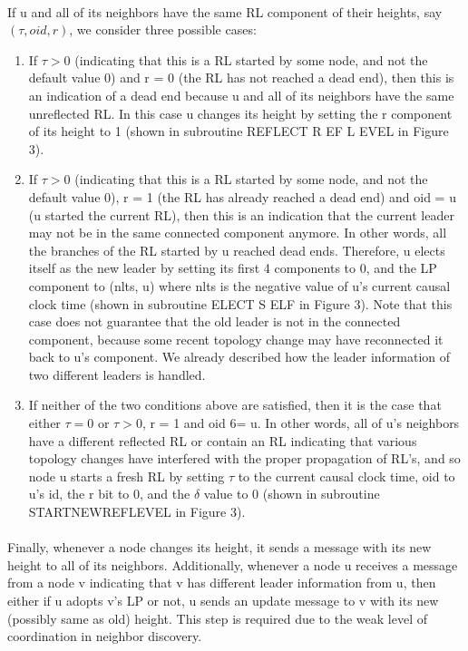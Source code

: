 \paragraph{}If u and all of its neighbors have the same RL component of their heights, say $(\tau, oid, r)$, we consider three possible cases:
\begin{enumerate}
	\item If $\tau > 0$ (indicating that this is a RL started by some node, and not the default value 0) and r = 0 (the RL has not reached a dead end), then this is an indication of a dead end because u and all of its neighbors have the same unreflected RL. In this case u changes its height by setting the r component of its height to 1 (shown in subroutine REFLECT R EF L EVEL in Figure 3).
	\item If $\tau > 0$ (indicating that this is a RL started by some node, and not the default value 0), r = 1 (the RL has already reached a dead end) and oid = u (u started the current RL), then this is an indication that the current leader may not be in the same connected component anymore. In other words, all the branches of the RL started by u reached dead ends. Therefore, u elects itself as the new leader by setting its first 4 components to 0, and the LP component to (nlts, u) where nlts is the negative value of u’s current causal clock time (shown in subroutine ELECT S ELF in Figure 3). Note that this case does not guarantee that the old leader is not in the connected component, because some recent topology change may have reconnected it back to u’s component. We already described how the leader information of two different leaders is handled.
	\item If neither of the two conditions above are satisfied, then it is the case that either $\tau = 0$ or $\tau > 0$, r = 1 and oid 6= u. In other words, all of u’s neighbors have a different reflected RL or contain an RL indicating that various topology changes have interfered with the proper propagation of RL’s, and so node u starts a fresh RL by setting $\tau$ to the current causal clock time, oid to u’s id, the r bit to 0, and the $\delta$ value to 0 (shown in subroutine STARTNEWREFLEVEL in Figure 3).
\end{enumerate}
\paragraph{}Finally, whenever a node changes its height, it sends a message with its new height to all of its neighbors. Additionally, whenever a node u receives a message from a node v indicating that v has different leader information from u, then either if u adopts v’s LP or not, u sends an update message to v with its new (possibly same as old) height. This step is required due to the weak level of coordination in neighbor discovery.
